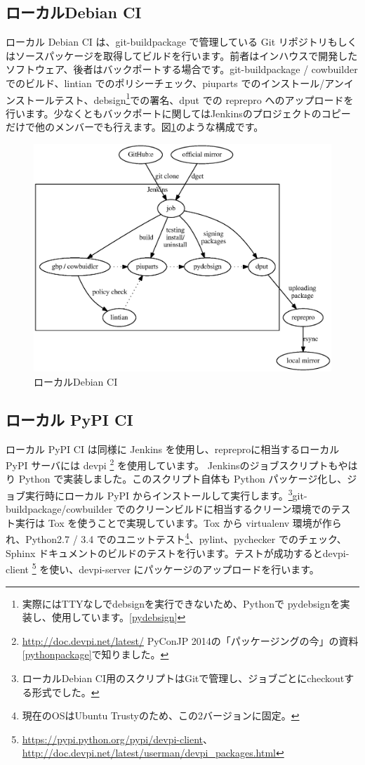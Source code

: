 \documentclass[mingoth,a4paper]{jsarticle}
\begin{document}
\subsection{ローカルDebian CI}

ローカル Debian CI は、git-buildpackage で管理している Git リポジトリもしくはソースパッケージを取得してビルドを行います。前者はインハウスで開発したソフトウェア、後者はバックポートする場合です。git-buildpackage / cowbuilder でのビルド、lintian でのポリシーチェック、piuparts でのインストール/アンインストールテスト、debsign\footnote{実際にはTTYなしでdebsignを実行できないため、Pythonで pydebsignを実装し、使用しています。\ref{pydebsign}}での署名、dput での reprepro へのアップロードを行います。少なくともバックポートに関してはJenkinsのプロジェクトのコピーだけで他のメンバーでも行えます。図\ref{fig:debian-ci}のような構成です。

\begin{figure}[htbp]
  \begin{center}
  \includegraphics[width=0.50\hsize]{image201504/debian-ci.eps}
  \caption{ローカルDebian CI}
  \label{fig:debian-ci}
  \end{center}
\end{figure}

\subsection{ローカル PyPI CI}

ローカル PyPI CI は同様に Jenkins を使用し、repreproに相当するローカル PyPI サーバには devpi \footnote{\url{http://doc.devpi.net/latest/} PyConJP 2014の「パッケージングの今」の資料\ref{pythonpackage}で知りました。} を使用しています。
Jenkinsのジョブスクリプトもやはり Python で実装しました。このスクリプト自体も Python パッケージ化し、ジョブ実行時にローカル PyPI からインストールして実行します。\footnote{ローカルDebian CI用のスクリプトはGitで管理し、ジョブごとにcheckoutする形式でした。}git-buildpackage/cowbuilder でのクリーンビルドに相当するクリーン環境でのテスト実行は Tox を使うことで実現しています。Tox から virtualenv 環境が作られ、Python2.7 / 3.4 でのユニットテスト\footnote{現在のOSはUbuntu Trustyのため、この2バージョンに固定。}、pylint、pychecker でのチェック、Sphinx ドキュメントのビルドのテストを行います。テストが成功するとdevpi-client \footnote{\url{https://pypi.python.org/pypi/devpi-client}、\url{http://doc.devpi.net/latest/userman/devpi_packages.html}} を使い、devpi-server にパッケージのアップロードを行います。
\end{document}
